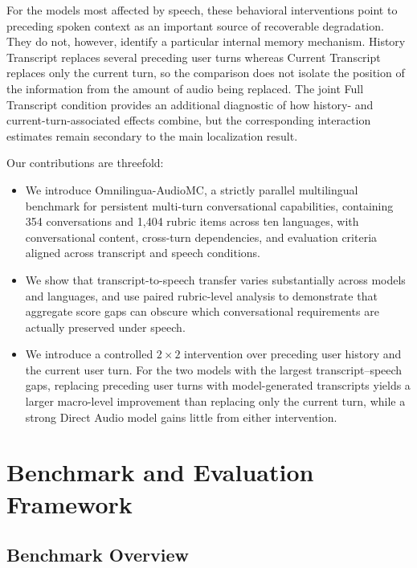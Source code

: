\documentclass{article}
\begin{document}
For the models most affected by speech, these behavioral interventions point to preceding spoken context as an important source of recoverable degradation. They do not, however, identify a particular internal memory mechanism. History Transcript replaces several preceding user turns whereas Current Transcript replaces only the current turn, so the comparison does not isolate the position of the information from the amount of audio being replaced. The joint Full Transcript condition provides an additional diagnostic of how history- and current-turn-associated effects combine, but the corresponding interaction estimates remain secondary to the main localization result.

Our contributions are threefold:

\begin{itemize}

\item We introduce Omnilingua-AudioMC, a strictly parallel multilingual benchmark for persistent multi-turn conversational capabilities, containing 354 conversations and 1,404 rubric items across ten languages, with conversational content, cross-turn dependencies, and evaluation criteria aligned across transcript and speech conditions.

\item We show that transcript-to-speech transfer varies substantially across models and languages, and use paired rubric-level analysis to demonstrate that aggregate score gaps can obscure which conversational requirements are actually preserved under speech.

\item We introduce a controlled $2\times2$ intervention over preceding user history and the current user turn. For the two models with the largest transcript--speech gaps, replacing preceding user turns with model-generated transcripts yields a larger macro-level improvement than replacing only the current turn, while a strong Direct Audio model gains little from either intervention.

\end{itemize}


\section{Benchmark and Evaluation Framework}
    \label{sec:benchmark}

    \subsection{Benchmark Overview}
    \label{sec:benchmark_overview}
\end{document}
